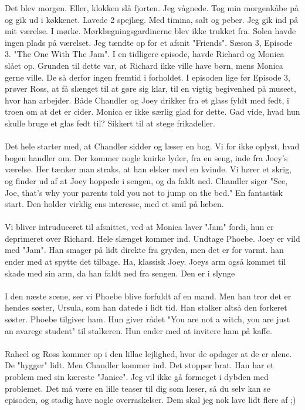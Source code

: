 \documentclass[]{article}
\begin{document}
Det blev morgen. Eller, klokken slå fjorten. Jeg vågnede. Tog min morgenkåbe på og gik ud i køkkenet. Lavede 2 spejlæg. Med timina, salt og peber. Jeg gik ind på mit værelse. I mørke. Mørklægningsgardinerne blev ikke trukket fra. Solen havde ingen plads på værelset. Jeg tændte op for et afsnit "Friends". Sæson 3, Episode 3. "The One With The Jam". I en tidligere episode, havde Richard og Monica slået op. Grunden til dette var, at Richard ikke ville have børn, mens Monica gerne ville. De så derfor ingen fremtid i forholdet. I episoden lige før Episode 3, prøver Ross, at få slænget til at gøre sig klar, til en vigtig begivenhed på museet, hvor han arbejder. Både Chandler og Joey drikker fra et glass fyldt med fedt, i troen om at det er cider. Monica er ikke særlig glad for dette. Gad vide, hvad hun skulle bruge et glas fedt til? Sikkert til at stege frikadeller.
\\ \\
Det hele starter med, at Chandler sidder og læser en bog. Vi for ikke oplyst, hvad bogen handler om. Der kommer nogle knirke lyder, fra en seng, inde fra Joey's værelse. Her tænker man straks, at han elsker med en kvinde. Vi hører et skrig, og finder ud af at Joey hoppede i sengen, og da faldt ned. Chandler siger "See, Joe, that's why your parents told you not to jump on the bed." En fantastisk start. Den holder virklig ens interesse, med et smil på læben.
\\ \\
Vi bliver intruduceret til afsnittet, ved at Monica laver "Jam" fordi, hun er deprimeret over Richard. Hele slænget kommer ind. Undtage Phoebe. Joey er vild med "Jam". Han smager på lidt direkte fra gryden, men det er for varmt. han ender med at spytte det tilbage. Ha, klassisk Joey. Joeys arm også kommet til skade med sin arm, da han faldt ned fra sengen. Den er i slynge
\\ \\
I den næste scene, ser vi Phoebe blive forfuldt af en mand. Men han tror det er hendes søster, Ursula, som han datede i lidt tid. Han stalker altså den forkeret søster. Phoebe tilgiver ham. Hun giver rådet "You are not a witch, you are just an avarege student" til stalkeren. Hun ender med at invitere ham på kaffe.
\\ \\
Rahcel og Ross kommer op i den lillae lejlighed, hvor de opdager at de er alene. De "hygger" lidt. Men Chandler kommer ind. Det stopper brat. Han har et problem med sin kæreste "Janice". Jeg vil ikke gå formeget i dybden med problemet. Det må være en lille teaser til dig som læser, så du selv kan se episoden, og stadig have nogle overraskelser. Dem skal jeg nok lave lidt flere af ;)
\end{document}
